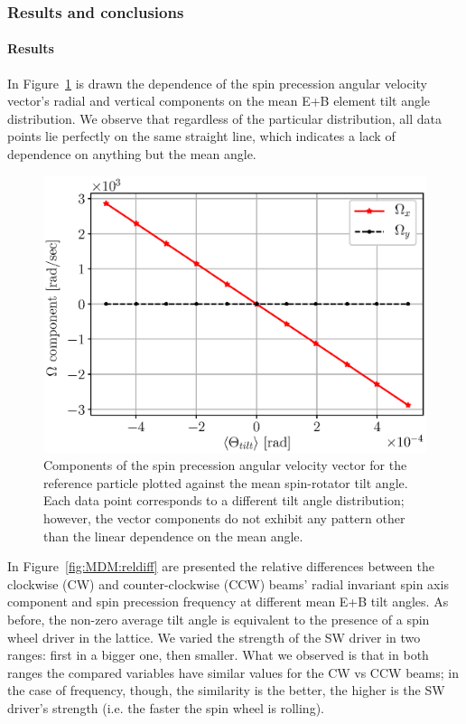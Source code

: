 \documentclass[]{elsarticle}
\begin{document}
\subsubsection{Results and conclusions}
\paragraph{Results}
In Figure~\ref{fig:MDM:linearity} is drawn the dependence of the spin precession angular velocity vector's
radial and vertical components on the mean E+B element tilt angle distribution. We observe that
regardless of the particular distribution, all data points lie perfectly on the same straight line,
which indicates a lack of dependence on anything but the mean angle.

\begin{figure}[h]\centering
  \includegraphics[width=\linewidth]{img/fake_signal/linearity_test_shifting_gauss_freq.eps}
  \caption{Components of the spin precession angular velocity vector for the reference particle
      plotted against the mean spin-rotator tilt angle.
      Each data point corresponds to a different tilt angle distribution; however,
      the vector components do not exhibit any pattern other than the linear
      dependence on the mean angle.\label{fig:MDM:linearity}}
\end{figure}

In Figure~\ref{fig:MDM:reldiff} are presented the relative differences between the clockwise (CW) and
counter-clockwise (CCW) beams' radial invariant spin axis component and spin precession frequency at different
mean E+B tilt angles. As before, the non-zero average tilt angle is equivalent to the presence of
a spin wheel driver in the lattice. We varied the strength of the SW driver in two ranges: first in
a bigger one, then smaller. What we observed is that in both ranges the compared variables have similar
values for the CW vs CCW beams; in the case of frequency, though, the similarity is the better, the higher is
the SW driver's strength (i.e. the faster the spin wheel is rolling).
\end{document}
